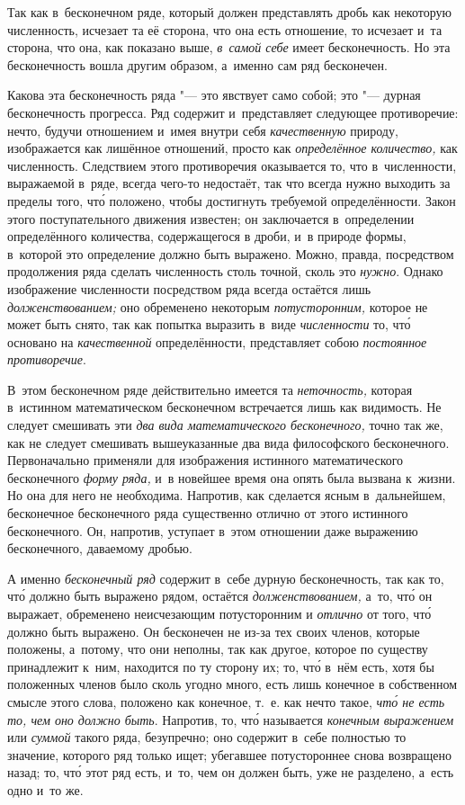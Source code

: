 Так как в~бесконечном ряде, который должен представлять дробь как некоторую
численность, исчезает та её сторона, что она есть отношение, то исчезает и~та
сторона, что она, как показано выше, {\em в~самой себе} имеет бесконечность. Но
эта бесконечность вошла другим образом, а~именно сам ряд бесконечен.

Какова эта бесконечность ряда "--- это явствует само собой; это "--- дурная
бесконечность прогресса. Ряд содержит и~представляет следующее
противоречие: нечто, будучи отношением и~имея внутри себя
{\em качественную} природу, изображается как лишённое отношений, просто как
{\em определённое количество,} как численность. Следствием
этого противоречия оказывается то, что в~численности, выражаемой в~ряде, всегда
чего-то недостаёт, так что всегда нужно выходить за пределы того, чт\'{о} положено,
чтобы достигнуть требуемой определённости. Закон этого поступательного движения
известен; он заключается в~определении определённого количества, содержащегося
в дроби, и~в природе формы, в~которой это определение должно быть выражено. Можно,
правда, посредством продолжения ряда сделать численность столь точной,
сколь это {\em нужно}. Однако изображение численности посредством ряда всегда
остаётся лишь {\em долженствованием;} оно обременено некоторым
{\em потусторонним,} которое не может быть снято, так как попытка выразить в~виде
{\em численности} то, чт\'{о} основано на {\em качественной} определённости,
представляет собою {\em постоянное противоречие}.

\label{bkm:bm52a}В~этом бесконечном ряде действительно имеется
та {\em неточность,} которая в~истинном математическом бесконечном
встречается лишь как видимость. Не следует смешивать
эти {\em два вида математического бесконечного,} точно так же, как
не следует смешивать вышеуказанные два вида философского
бесконечного. Первоначально применяли для изображения истинного
математического бесконечного {\em форму ряда,} и~в новейшее время она опять
была вызвана к~жизни. Но она для него не необходима. Напротив, как сделается
ясным в~дальнейшем, бесконечное бесконечного ряда существенно отлично от этого
истинного бесконечного. Он, напротив, уступает в~этом отношении даже выражению
бесконечного, даваемому дробью.

А именно {\em бесконечный ряд} содержит в~себе дурную бесконечность, так как
то, чт\'{о} должно быть выражено рядом, остаётся {\em долженствованием,} а~то,
чт\'{о} он выражает, обременено неисчезающим потусторонним и {\em отлично} от
того, чт\'{о} должно быть выражено. Он бесконечен не из-за тех своих членов,
которые положены, а~потому, что они неполны, так как другое, которое по
существу принадлежит к~ним, находится по ту сторону их; то, чт\'{о} в~нём есть,
хотя бы положенных членов было сколь угодно много, есть лишь конечное в
собственном смысле этого слова, положено как конечное, т.~е. как нечто такое,
{\em чт\'{о} не есть то, чем оно должно быть}. Напротив, то, чт\'{о} называется
{\em конечным выражением} или {\em суммой} такого ряда, безупречно; оно
содержит в~себе полностью то значение, которого ряд только ищет; убегавшее
потустороннее снова возвращено назад; то, чт\'{о} этот ряд есть, и~то, чем он
должен быть, уже не разделено, а~есть одно и~то же.

